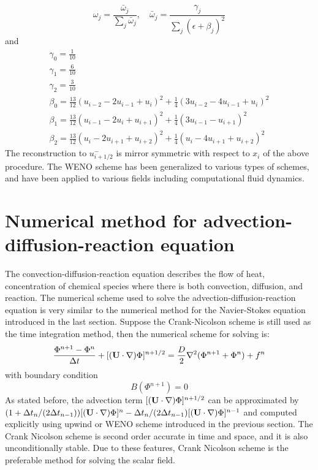\begin{equation}
\omega_j = \frac{\bar{\omega}_j}{\sum_j\bar{\omega}_j}, \quad
\bar{\omega}_j = \frac{\gamma_j}{\sum_j(\epsilon + \beta_j)^2}
\end{equation}
and
\begin{eqnarray*}
\gamma_0 = \frac{1}{10}\\
\gamma_1 = \frac{6}{10}\\
\gamma_2 = \frac{3}{10}\\
\beta_0 = \frac{13}{12}(u_{i-2} - 2 u_{i-1} + u_i)^2 + \frac{1}{4}(3u_{i-2} - 4u_{i-1} + u_i)^2 \\
\beta_1 = \frac{13}{12}(u_{i-1} - 2u_i + u_{i+1})^2 + \frac{1}{4}(3u_{i-1} - u_{i+1})^2\\
\beta_2 = \frac{13}{12}(u_i - 2u_{i+1} + u_{i+2})^2 + \frac{1}{4}(u_i - 4u_{i+1} + u_{i+2})^2
\end{eqnarray*}
The reconstruction to $u_{i+1/2}^-$ is mirror symmetric with respect to $x_i$ of the above procedure. The WENO scheme has been generalized to various types of schemes, and have been applied to various fields including computational fluid dynamics.

\section{Numerical method for advection-diffusion-reaction equation}
The convection-diffusion-reaction equation describes the flow of heat, concentration of chemical species where there is both convection, diffusion, and reaction. The numerical scheme used to solve the advection-diffusion-reaction equation is very similar to the numerical method for the Navier-Stokes equation introduced in the last section. Suppose the Crank-Nicolson scheme is still used as the time integration method, then the numerical scheme for solving  is:
\begin{equation}
\frac{\Phi^{n+1}-\Phi^n}{\Delta t} + [(\mathbf{U}\cdot\nabla)\Phi]^{n+1/2} = \frac{D}{2}\nabla^2(\Phi^{n+1} + \Phi^n) + f^n
\label{phi_disc_eqn}
\end{equation}
with boundary condition
\begin{equation}
B(\Phi^{n+1}) = 0
\label{phi_bc}
\end{equation}
As stated before, the advection term $[(\mathbf{U}\cdot\nabla)\Phi]^{n+1/2}$ can be approximated by $(1+\Delta t_n/(2\Delta t_{n-1}))[(\mathbf{U}\cdot \nabla)\Phi]^{n} -\Delta t_n/(2\Delta t_{n-1})[(\mathbf{U}\cdot \nabla)\Phi]^{n-1}$ and computed explicitly using upwind or WENO scheme introduced in the previous section. The Crank Nicolson scheme is second order accurate in time and space, and it is also unconditionally stable. Due to these features, Crank Nicolson scheme is the preferable method for solving the scalar field.

